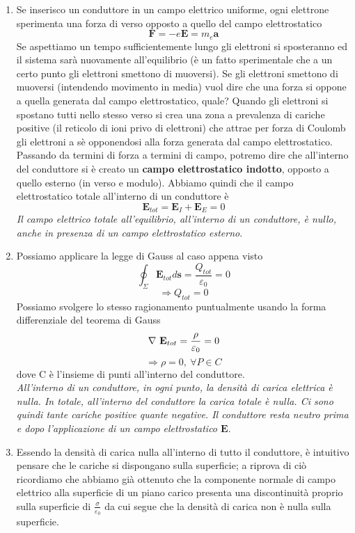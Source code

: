 \documentclass[
10pt, %
a4paper, %
oneside, %
headinclude,footinclude, %
BCOR5mm, %
]{scrartcl}
\begin{document}
\begin{enumerate}
\item	Se inserisco un conduttore in un campo elettrico uniforme, ogni elettrone sperimenta una forza di verso opposto a quello del campo elettrostatico
\[\mathbf{F} = -e\mathbf{E} = m_e \mathbf{a}\]
Se aspettiamo un tempo sufficientemente lungo gli elettroni si sposteranno ed il sistema sarà nuovamente all'equilibrio (è un fatto sperimentale che a un certo punto gli elettroni smettono di muoversi). Se gli elettroni smettono di muoversi (intendendo movimento in media) vuol dire che una forza si oppone a quella generata dal campo elettrostatico, quale? Quando gli elettroni si spostano tutti nello stesso verso si crea una zona a prevalenza di cariche positive (il reticolo di ioni privo di elettroni) che attrae per forza di Coulomb gli elettroni a sè opponendosi alla forza generata dal campo elettrostatico. Passando da termini di forza a termini di campo, potremo dire che all'interno del conduttore si è creato un \textbf{campo elettrostatico indotto}, opposto a quello esterno (in verso e modulo). Abbiamo quindi che il campo elettrostatico totale all'interno di un conduttore è
\[\mathbf{E}_{tot} = \mathbf{E}_I+\mathbf{E}_E = 0\]
\textit{Il campo elettrico totale all'equilibrio, all'interno di un conduttore, è nullo, anche in presenza di un campo elettrostatico esterno}.
\item Possiamo applicare la legge di Gauss al caso appena visto 
\[\oint_{\Sigma}\mathbf{E}_{tot}d\mathbf{s}= \frac{Q_{tot}}{\varepsilon_0} = 0\]
\[\Rightarrow Q_{tot} = 0\]
Possiamo svolgere lo stesso ragionamento puntualmente usando la forma differenziale del teorema di Gauss
\[\mathbf{\nabla\ }\mathbf{E}_{tot}=\frac{\rho}{\varepsilon_0}=0 \]
\[\Rightarrow \rho = 0,\ \forall P \in C\]
dove C è l'insieme di punti all'interno del conduttore. \\
\textit{All'interno di un conduttore, in ogni punto, la densità di carica elettrica è nulla. In totale, all'interno del conduttore la carica totale è nulla. Ci sono quindi tante cariche positive quante negative. Il conduttore resta neutro prima e dopo l'applicazione di un campo elettrostatico $\mathbf{E}$}.
\item Essendo la densità di carica nulla all'interno di tutto il conduttore, è intuitivo pensare che le cariche si dispongano sulla superficie; a riprova di ciò ricordiamo che abbiamo già ottenuto che la componente normale di campo elettrico alla superficie di un piano carico presenta una discontinuità proprio sulla superficie di \(\frac{\sigma}{\varepsilon_0}\) da cui segue che la densità di carica non è nulla sulla superficie. \\

\end{enumerate}
\end{document}
